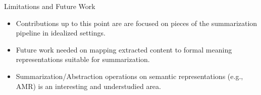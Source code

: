 \begin{frame}{Limitations and Future Work}

    \begin{center}
    \end{center}

\begin{itemize}

\item Contributions up to this point are are focused on pieces of the summarization pipeline in idealized settings.

    \vspace{10pt}
\item Future work needed on mapping extracted content to formal meaning representations suitable for summarization.

    \vspace{10pt}
\item Summarization/Abstraction operations on semantic representations (e.g., AMR) is an interesting and understudied area.

\end{itemize}


\end{frame}

